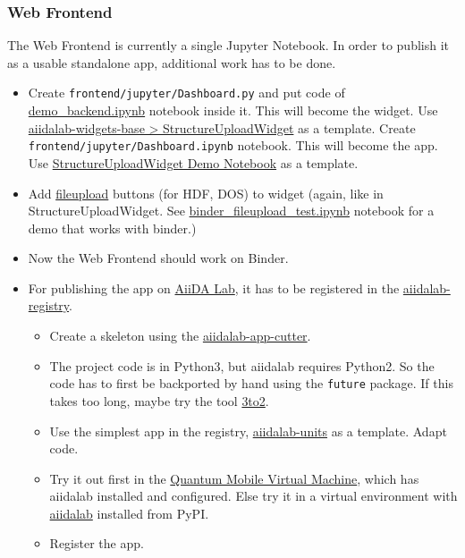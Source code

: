\subsubsection{Web Frontend}\label{web-frontend-1}

The Web Frontend is currently a single Jupyter Notebook. In order to
publish it as a usable standalone app, additional work has to be done.

\begin{itemize}
    \tightlist
\item
    Create \texttt{frontend/jupyter/Dashboard.py} and
    put code of
    \href{./frontend/jupyter/demo/demo_backend.ipynb}{demo\_backend.ipynb}
    notebook inside it. This will become the widget. Use 
    \href{https://github.com/aiidalab/aiidalab-widgets-base/blob/master/aiidalab_widgets_base/structures.py}{aiidalab-widgets-base
      > StructureUploadWidget} as a template. Create
    \texttt{frontend/jupyter/Dashboard.ipynb} notebook. This will become the app. Use
    \href{https://github.com/aiidalab/aiidalab-widgets-base/blob/master/structures.ipynb}{StructureUploadWidget
      Demo Notebook} as a template.
\item
    Add \href{https://pypi.org/project/fileupload/}{fileupload} buttons (for
    HDF, DOS) to widget
    (again, like in StructureUploadWidget. See
    \href{./frontend/jupyter/demo/binder_fileupload_test.ipynb}{binder\_fileupload\_test.ipynb}
    notebook for a demo that works with binder.)
\item
    Now the Web Frontend should work on Binder.
\item
    For publishing the app on \href{https://aiidalab.materialscloud.org}{AiiDA Lab}, it has to be registered in
    the
    \href{https://github.com/aiidalab/aiidalab-registry}{aiidalab-registry}.

    \begin{itemize}
        \tightlist
    \item
        Create a skeleton using the
        \href{https://github.com/aiidalab/aiidalab-app-cutter}{aiidalab-app-cutter}.
    \item
        The project code is in Python3, but aiidalab requires Python2. So
        the code has to first be backported by hand using the \texttt{future}
        package. If this takes too long, maybe try the tool
        \href{https://pypi.org/project/3to2/}{3to2}.
    \item
        Use the simplest app in the registry,
        \href{https://github.com/aiidalab/aiidalab-units}{aiidalab-units} as
        a template. Adapt code.
    \item
        Try it out first in the
        \href{https://www.materialscloud.org/work/quantum-mobile}{Quantum
          Mobile Virtual Machine}, which has aiidalab installed and
        configured. Else try it in a virtual environment with
        \href{https://pypi.org/project/aiidalab/}{aiidalab} installed from
        PyPI.
    \item
        Register the app.
    \end{itemize}
\end{itemize}

